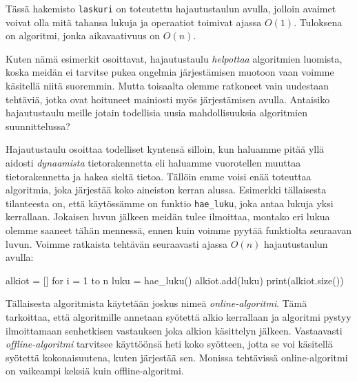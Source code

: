 Tässä hakemisto \texttt{laskuri}
on toteutettu hajautustaulun avulla,
jolloin avaimet voivat olla mitä tahansa lukuja
ja operaatiot toimivat ajassa $O(1)$.
Tuloksena on algoritmi, jonka aikavaativuus on $O(n)$.

Kuten nämä esimerkit osoittavat, hajautustaulu
\emph{helpottaa} algoritmien luomista,
koska meidän ei tarvitse pukea ongelmia järjestämisen muotoon
vaan voimme käsitellä niitä suoremmin.
Mutta toisaalta olemme ratkoneet vain uudestaan tehtäviä,
jotka ovat hoituneet mainiosti myös järjestämisen avulla.
Antaisiko hajautustaulu meille jotain todellisia uusia
mahdollisuuksia algoritmien suunnittelussa?

Hajautustaulu osoittaa todelliset kyntensä silloin,
kun haluamme pitää yllä aidosti \emph{dynaamista}
tietorakennetta eli haluamme vuorotellen muuttaa
tietorakennetta ja hakea sieltä tietoa.
Tällöin emme voisi enää toteuttaa algoritmia,
joka järjestää koko aineiston kerran alussa.
Esimerkki tällaisesta tilanteesta on,
että käytössämme on funktio \texttt{hae\_luku},
joka antaa lukuja yksi kerrallaan.
Jokaisen luvun jälkeen meidän tulee ilmoittaa,
montako eri lukua olemme saaneet tähän mennessä,
ennen kuin voimme pyytää funktiolta seuraavan luvun.
Voimme ratkaista tehtävän seuraavasti ajassa $O(n)$
hajautustaulun avulla:

\begin{code}
alkiot = []
for i = 1 to n
    luku = hae_luku()
    alkiot.add(luku)
    print(alkiot.size())
\end{code}


Tällaisesta algoritmista käytetään joskus nimeä
\emph{online-algoritmi}.
Tämä tarkoittaa, että algoritmille annetaan syötettä
alkio kerrallaan ja algoritmi pystyy ilmoittamaan senhetkisen
vastauksen joka alkion käsittelyn jälkeen.
Vastaavasti \emph{offline-algoritmi} tarvitsee
käyttöönsä heti koko syötteen,
jotta se voi käsitellä syötettä kokonaisuutena,
kuten järjestää sen.
Monissa tehtävissä online-algoritmi on vaikeampi
keksiä kuin offline-algoritmi.
